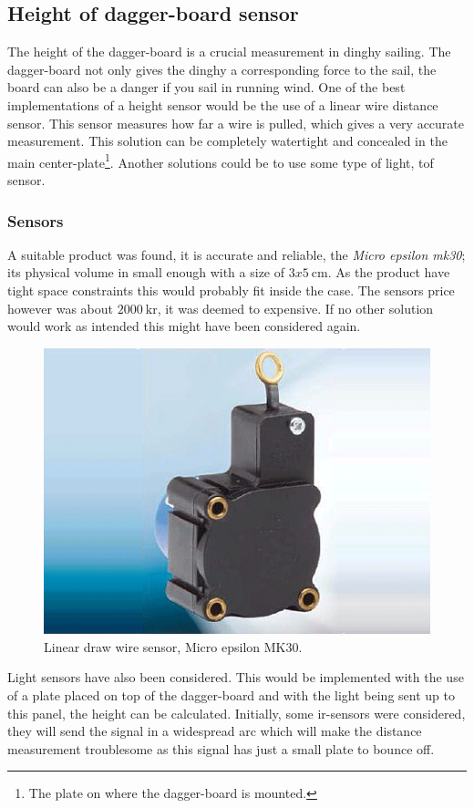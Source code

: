 \subsection{Height of dagger-board sensor}
The height of the dagger-board is a crucial measurement in dinghy sailing. The dagger-board not only gives the dinghy a corresponding force to the sail, the board can also be a danger if you sail in running wind. One of the best implementations of a height sensor would be the use of a linear wire distance sensor. This sensor measures how far a wire is pulled, which gives a very accurate measurement. This solution can be completely watertight and concealed in the main center-plate\footnote{The plate on where the dagger-board is mounted.}. Another solutions could be to use some type of light, \gls{tof} sensor. 

\subsubsection{Sensors}
A suitable product was found, it is accurate and reliable, the \emph{Micro epsilon mk30}; its physical volume in small enough with a size of $3x5~\textrm{cm}$. As the product have tight space constraints this would probably fit inside the case. The sensors price however was about $2000~\textrm{kr}$, it was deemed to expensive. If no other solution would work as intended this might have been considered again.
\begin{figure}[H]
\begin{center}
	\includegraphics[width = .45\textwidth]{Figures/microepsilon_mk30.png}
	\caption{Linear draw wire sensor, Micro epsilon MK30.}
	\label{Draw_sensor}
\end{center}
\end{figure}

Light sensors have also been considered. This would be implemented with the use of a plate placed on top of the dagger-board and with the light being sent up to this panel, the height can be calculated. Initially, some \gls{ir}-sensors were considered,  they will send the signal in a widespread arc which will make the distance measurement troublesome as this signal has just a small plate to bounce off.

